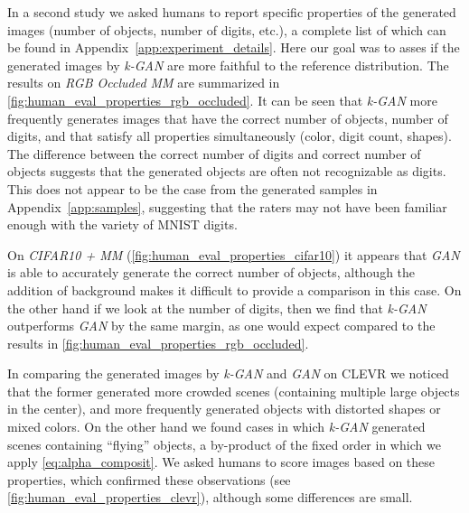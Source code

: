 \documentclass{article}
\begin{document}
In a second study we asked humans to report specific properties of the generated images (number of objects, number of digits, etc.), 
a complete list of which can be found in Appendix~\ref{app:experiment_details}.
Here our goal was to asses if the generated images by \emph{k-GAN} are more faithful to the reference distribution.
The results on \emph{RGB Occluded MM} are summarized in \autoref{fig:human_eval_properties_rgb_occluded}.
It can be seen that \emph{k-GAN} more frequently generates images that have the correct number of objects, number of digits, and that satisfy all properties simultaneously (color, digit count, shapes).
The difference between the correct number of digits and correct number of objects suggests that the generated objects are often not recognizable as digits.
This does not appear to be the case from the generated samples in Appendix~\ref{app:samples}, suggesting that the raters may not have been familiar enough with the variety of MNIST digits.

On \emph{CIFAR10 + MM} (\autoref{fig:human_eval_properties_cifar10}) it appears that \emph{GAN} is able to accurately generate the correct number of objects, although the addition of background makes it difficult to provide a comparison in this case.
On the other hand if we look at the number of digits, then we find that \emph{k-GAN} outperforms \emph{GAN} by the same margin, as one would expect compared to the results in \autoref{fig:human_eval_properties_rgb_occluded}.

In comparing the generated images by \emph{k-GAN} and \emph{GAN} on CLEVR we noticed that the former generated more crowded scenes (containing multiple large objects in the center), and more frequently generated objects with distorted shapes or mixed colors. 
On the other hand we found cases in which \emph{k-GAN} generated scenes containing ``flying'' objects, a by-product of the fixed order in which we apply \eqref{eq:alpha_composit}.
We asked humans to score images based on these properties, which confirmed these observations (see \autoref{fig:human_eval_properties_clevr}), although some differences are small.
\end{document}
